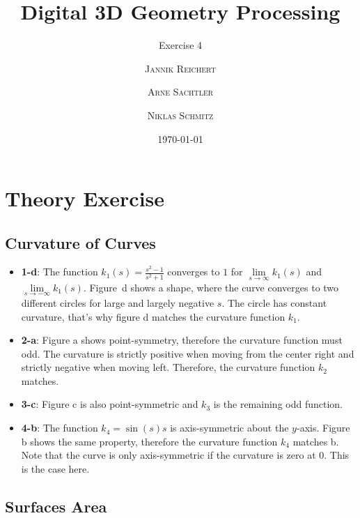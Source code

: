 \documentclass{scrartcl}
\title{Digital 3D Geometry Processing}
\subtitle{Exercise 4}
\author{\textsc{Jannik Reichert} \and \textsc{Arne Sachtler} \and \textsc{Niklas Schmitz}}
\date{\today}
\begin{document}
\maketitle

\section{Theory Exercise}

\subsection{Curvature of Curves}

\begin{itemize}
	\item \textbf{1-d}: The function $k_1(s) = \frac{s^2 -1}{s^2+1}$ converges to $1$ for $\lim\limits_{s \rightarrow \infty} k_1(s)$ and $\lim\limits_{s \rightarrow -\infty} k_1(s)$. Figure~d shows a shape, where the curve converges to two different circles for large and largely negative $s$. The circle has constant curvature, that's why figure d matches the curvature function $k_1$.
	\item \textbf{2-a}: Figure a shows point-symmetry, therefore the curvature function must odd. The curvature is strictly positive when moving from the center right and strictly negative when moving left. Therefore, the curvature function $k_2$ matches.
	\item \textbf{3-c}: Figure c is also point-symmetric and $k_3$ is the remaining odd function.
	\item \textbf{4-b}: The function $k_4 = \sin(s)s$ is axis-symmetric about the $y$-axis. Figure b shows the same property, therefore the curvature function $k_4$ matches b. Note that the curve is only axis-symmetric if the curvature is zero at $0$. This is the case here.
\end{itemize}

\subsection{Surfaces Area}
\end{document}
